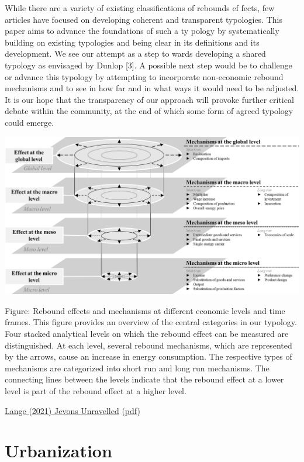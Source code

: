 \documentclass[
]{book}
\begin{document}
While there are a variety of existing classifications of rebounds ef­
fects, few articles have focused on developing coherent and transparent
typologies. This paper aims to advance the foundations of such a ty­
pology by systematically building on existing typologies and being clear
in its definitions and its development. We see our attempt as a step to­
wards developing a shared typology as envisaged by Dunlop {[}3{]}. A
possible next step would be to challenge or advance this typology by
attempting to incorporate non-economic rebound mechanisms and to
see in how far and in what ways it would need to be adjusted. It is our
hope that the transparency of our approach will provoke further critical
debate within the community, at the end of which some form of agreed
typology could emerge.

\includegraphics{fig/lange_rebound_levels.png}

Figure: Rebound effects and mechanisms at different economic levels and time frames. This figure provides an overview of the central categories in our typology.
Four stacked analytical levels on which the rebound effect can be measured are distinguished. At each level, several rebound mechanisms, which are represented by
the arrows, cause an increase in energy consumption. The respective types of mechanisms are categorized into short run and long run mechanisms. The connecting
lines between the levels indicate that the rebound effect at a lower level is part of the rebound effect at a higher level.

\href{https://www.sciencedirect.com/science/article/pii/S221462962100075X}{Lange (2021) Jevons Unravelled}
\href{pdf/Lange_2021_Jevons_Unravelled.pdf}{(pdf)}

\hypertarget{urbanization}{%
\section{Urbanization}\label{urbanization}}
\end{document}
